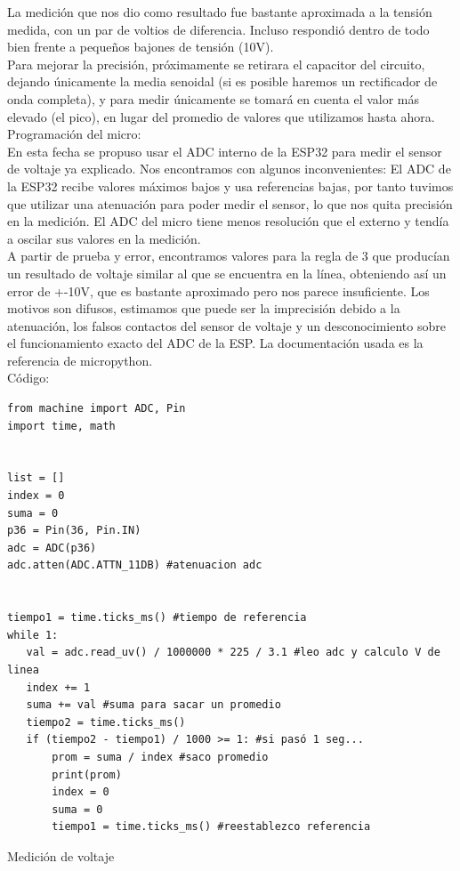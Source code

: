 La medición que nos dio como resultado fue bastante aproximada a la tensión medida, con un par de voltios de diferencia. Incluso respondió dentro de todo bien frente a pequeños bajones de tensión (10V).\\

Para mejorar la precisión, próximamente se retirara el capacitor del circuito, dejando únicamente la media senoidal (si es posible haremos un rectificador de onda completa), y para medir únicamente se tomará en cuenta el valor más elevado (el pico), en lugar del promedio de valores que utilizamos hasta ahora.\\


Programación del micro:\\

En esta fecha se propuso usar el ADC interno de la ESP32 para medir el sensor de voltaje ya explicado. Nos encontramos con algunos inconvenientes:
El ADC de la ESP32 recibe valores máximos bajos y usa referencias bajas, por tanto tuvimos que utilizar una atenuación para poder medir el sensor, lo que nos quita precisión en la medición.
El ADC del micro tiene menos resolución que el externo y tendía a oscilar sus valores en la medición.\\

A partir de prueba y error, encontramos valores para la regla de 3 que producían un resultado de voltaje similar al que se encuentra en la línea, obteniendo así un error de +-10V, que es bastante aproximado pero nos parece insuficiente. Los motivos son difusos, estimamos que puede ser la imprecisión debido a la atenuación, los falsos contactos del sensor de voltaje y un desconocimiento sobre el funcionamiento exacto del ADC de la ESP. La documentación usada es la referencia de micropython.\\

Código:\\
\begin{listing}[H]
\begin{verbatim}
from machine import ADC, Pin
import time, math


list = []
index = 0
suma = 0
p36 = Pin(36, Pin.IN)
adc = ADC(p36)
adc.atten(ADC.ATTN_11DB) #atenuacion adc


tiempo1 = time.ticks_ms() #tiempo de referencia
while 1:
   val = adc.read_uv() / 1000000 * 225 / 3.1 #leo adc y calculo V de linea
   index += 1
   suma += val #suma para sacar un promedio
   tiempo2 = time.ticks_ms()
   if (tiempo2 - tiempo1) / 1000 >= 1: #si pasó 1 seg...
       prom = suma / index #saco promedio
       print(prom)
       index = 0
       suma = 0
       tiempo1 = time.ticks_ms() #reestablezco referencia
\end{verbatim}
\caption{Medición de voltaje}
\label{medicion voltaje}
\end{listing}

